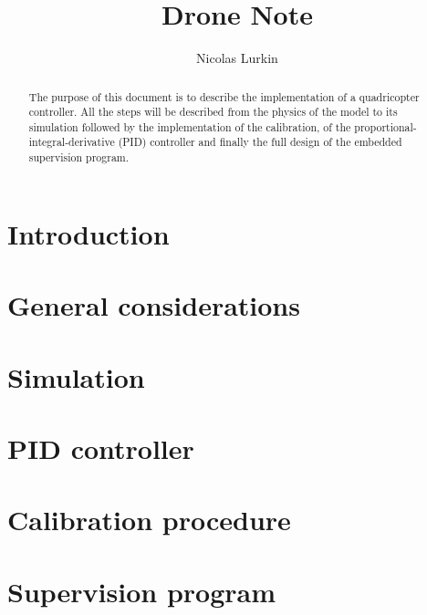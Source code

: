 \documentclass{article}
\title{Drone Note}
\author{Nicolas Lurkin}
\begin{document}
\maketitle

\begin{abstract}
The purpose of this document is to describe the implementation of a quadricopter
controller. All the steps will be described from the physics of the model to its
simulation followed by the implementation of the calibration, of the
proportional-integral-derivative (PID) controller and finally the full design of
the embedded supervision program.
\end{abstract}

\section{Introduction} 

\section{General considerations}


\section{Simulation}


\section{PID controller}


\section{Calibration procedure}

\section{Supervision program}

\thebibliography{}
\end{document}
